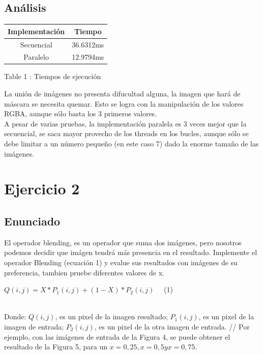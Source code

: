 \documentclass[https://www.overleaf.com/project/63761df255a8a9f4a15c3579
	letterpaper, %
	10pt, %
]{CSUniSchoolLabReport}
\begin{document}
\subsection*{Análisis}
\begin{center}
    \begin{tabular}{| c | c |}
        \hline
            Implementación & Tiempo 
             \\ 
        \hline
            Secuencial & 36.6312ms
            \\
            Paralelo & 12.9794ms
            \\
        \hline
    \end{tabular}
\end{center}
 \begin{center}
    Table 1 : Tiempos de ejecución
 \end{center}

La unión de imágenes no presenta difucultad alguna, la imagen que hará de máscara se necesita quemar. Esto se logra con la manipulación de los valores RGBA, aunque sólo basta los 3 primeros valores.
\\
A pesar de varias pruebas, la implementación paralela es 3 veces mejor que la secuencial, se saca mayor provecho de los threads en los bucles, aunque sólo se debe limitar a un número pequeño (en este caso 7) dado la enorme tamaño de las imágenes. 


\section*{Ejercicio 2 }

\subsection*{Enunciado}
El operador blending, es un operador que suma dos imágenes, pero nosotros podemos decidir que imágen tendrá más presencia en el resultado. Implemente el operador Blending (ecuación 1) y evalue sus resultados con imágenes de su preferencia, tambien pruebe diferentes valores de x.
\\
\begin{center}
    \(Q(i,j)=X*P_{1}(i,j)+(1-X)*P_{2}(i,j)\) \ \ (1)
\end{center}
\\
Donde: \(Q(i, j)\), es un pixel de la imagen resultado; \(P_{1}(i, j)\), es un pixel de la imagen de entrada; \(P_{2}(i, j)\), es un pixel de la otra imagen de entrada.
//
Por ejemplo, con las imágenes de entrada de la Figura 4, se puede obtener el resultado de la
Figura 5, para un \(x = 0,25, x = 0,5 y x = 0,75\).
\end{document}
